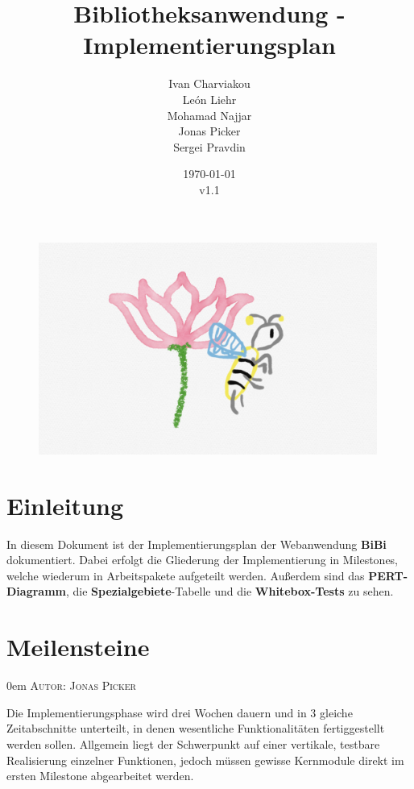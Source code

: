 \documentclass{article}
\title{Bibliotheksanwendung - Implementierungsplan}
\date{\today\\v1.1}
\author{
	Ivan Charviakou\\
	León Liehr\\
	Mohamad Najjar\\
	Jonas Picker\\
	Sergei Pravdin
}
\makeatletter
\newcommand{\sectionauthor}[1]{
	{\parindent 0em \large \scshape Autor: #1 \par \nobreak \vspace*{1em}}
	\@afterheading
}
\makeatother
\begin{document}
\maketitle
\begin{figure}[H]
	\centering
	\includegraphics[width = 30em]{Logo}
\end{figure}
\newpage
\tableofcontents
\newpage


\section{Einleitung}

In diesem Dokument ist der Implementierungsplan der Webanwendung \textbf{BiBi} dokumentiert. Dabei erfolgt die Gliederung der Implementierung in Milestones, welche wiederum in Arbeitspakete aufgeteilt werden. Außerdem sind das \textbf{PERT-Diagramm},   die \textbf{Spezialgebiete}-Tabelle und die \textbf{Whitebox-Tests} zu sehen.


\section{Meilensteine}
\sectionauthor{Jonas Picker}
Die Implementierungsphase wird drei Wochen dauern und in 3 gleiche Zeitabschnitte unterteilt, in denen wesentliche Funktionalitäten fertiggestellt werden sollen. Allgemein liegt der Schwerpunkt auf einer vertikale, testbare Realisierung einzelner Funktionen, jedoch müssen gewisse Kernmodule direkt im ersten Milestone abgearbeitet werden.
\end{document}
